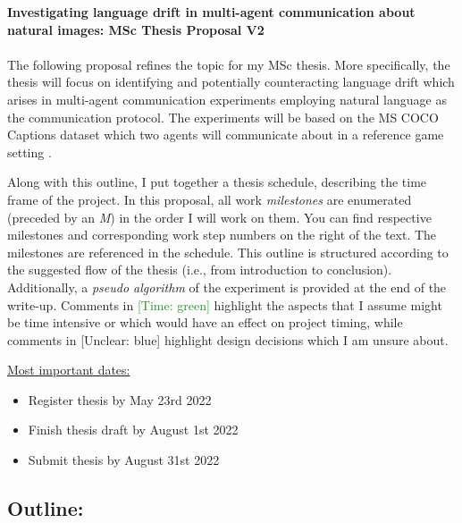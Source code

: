 \documentclass[11pt,letterpaper]{article}
\newcommand{\unclear}[1]{\textcolor{Cerulean}{[Unclear: #1]}}
\newcommand{\timing}[1]{\textcolor{ForestGreen}{[Time: #1]}}
\renewcommand{\title}[1]{\textbf{#1}\\}
\newcommand{\authors}[1]{\iftoggle{anonymous}{\phantom{#1}}{#1}\\}
\begin{document}


\title{Investigating language drift in multi-agent communication about natural images: MSc Thesis Proposal V2 \newline}
\authors{By Polina Tsvilodub, \textit{February 16th 2022}}

The following proposal refines the topic for my MSc thesis. More specifically, the thesis will focus on identifying and potentially counteracting language drift which arises in multi-agent communication experiments employing natural language as the communication protocol. The experiments will be based on the MS COCO Captions dataset which two agents will communicate about in a reference game setting \cite{chen2015microsoft, lazaridou2016multi}.

Along with this outline, I put together a thesis schedule, describing the time frame of the project. In this proposal, all work \textit{milestones} are enumerated (preceded by an \textit{M}) in the order I will work on them. You can find respective milestones and corresponding work step numbers on the right of the text. The milestones are referenced in the schedule. This outline is structured according to the suggested flow of the thesis (i.e., from introduction to conclusion).  
Additionally, a \textit{pseudo algorithm} of the experiment is provided at the end of the write-up. Comments in \timing{green} highlight the aspects that I assume might be time intensive or which would have an effect on project timing, while comments in \unclear{blue} highlight design decisions which I am unsure about.

\underline{Most important dates:}
\begin{itemize}
	\item Register thesis by May 23rd 2022 
	\item Finish thesis draft by August 1st 2022 
	\item Submit thesis by August 31st 2022 
\end{itemize}

\subsection*{Outline:}
\end{document}
